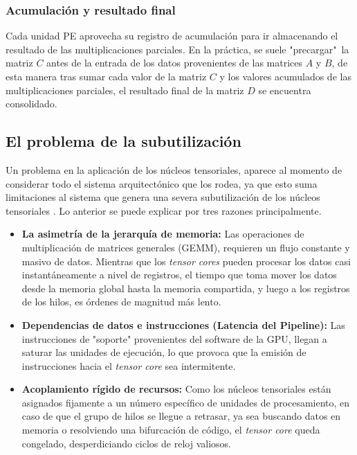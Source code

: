 \documentclass[conference]{IEEEtran}
\begin{document}
\subsubsection{Acumulación y resultado final}
Cada unidad PE aprovecha su registro de acumulación para ir almacenando el resultado de las multiplicaciones
parciales. En la práctica, se suele "precargar"~la matriz $C$ antes de la entrada de los datos provenientes de
las matrices $A$ y $B$, de esta manera tras sumar cada valor de la matriz $C$ y los valores acumulados de las 
multiplicaciones parciales, el resultado final de la matriz $D$ se encuentra consolidado.

\subsection{El problema de la subutilización}
Un problema en la aplicación de los núcleos tensoriales, aparece al momento de considerar 
todo el sistema arquitectónico que los rodea, ya que esto suma limitaciones al sistema que genera
una severa subutilización de los núcleos tensoriales \cite{nada2025cooperative}. Lo anterior
se puede explicar por tres razones principalmente.

\begin{itemize}
    \item \textbf{La asimetría de la jerarquía de memoria:} Las operaciones de multiplicación de matrices generales (GEMM), 
    requieren un flujo constante y masivo de datos. Mientras que los \textit{tensor cores} pueden procesar los datos
    casi instantáneamente a nivel de registros, el tiempo que toma mover los datos desde la memoria global hasta la memoria compartida, 
    y luego a los registros de los hilos, es órdenes de magnitud más lento.

    \item \textbf{Dependencias de datos e instrucciones (Latencia del Pipeline):} Las instrucciones de "soporte" provenientes del software
    de la GPU, llegan a saturar las unidades de ejecución, lo que provoca que la emisión de instrucciones hacia el
    \textit{tensor core} sea intermitente. 
    
    \item \textbf{Acoplamiento rígido de recursos:} Como los núcleos tensoriales están asignados fijamente a un número específico de
    unidades de procesamiento, en caso de que el grupo de hilos se llegue a retrasar, ya sea buscando datos en memoria o resolviendo una
    bifurcación de código, el \textit{tensor core} queda congelado, desperdiciando ciclos de reloj valiosos. 
\end{itemize}
\end{document}
